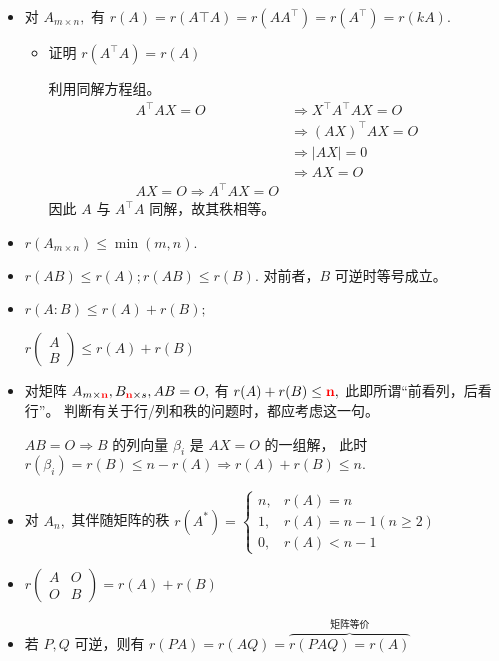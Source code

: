 \begin{itemize}
    \item 对 $ A_{m\times n}, $ 有 $ r(A) = r(A\top A) = r(AA^\top) = r(A^\top) = r(kA). $
    \begin{itemize}
        \item 证明 $ r(A^\top A) = r(A) $ 
        
        利用同解方程组。
        \begin{equation*}
            \begin{aligned}
                A^\top AX = O &\Rightarrow X^\top A^\top AX = O \\ 
                &\Rightarrow (AX)^\top AX = O \\ &\Rightarrow |AX| = 0
                \\ &\Rightarrow AX = O \\ 
                AX = O \Rightarrow A^\top AX = O
            \end{aligned}
        \end{equation*}
        因此 $ A $ 与 $ A^\top A $ 同解，故其秩相等。
    \end{itemize} 
    \item $ r(A_{m\times n})\leq \min(m,n). $ 
    \item $ r(AB) \leq r(A); r(AB) \leq r(B). $ 对前者，$ B $ 可逆时等号成立。
    \item $ r(A:B)\leq r(A) + r(B); $ 
    
    $ r(\begin{matrix}
        A \\ B 
    \end{matrix}) \leq r(A) + r(B)$ 
    \item 对矩阵 $ A_{m\times \textcolor{red}{\bf{n}}},B_{\textcolor{red}{\bf{n}}\times s}, AB=O, $
    有 $ r(A) + r(B) \leq \textcolor{red}{\bf{n}}, $ 此即所谓“前看列，后看行”。
    判断有关于行/列和秩的问题时，都应考虑这一句。

    $AB = O \Rightarrow B $ 的列向量 $ \beta_i $ 是 $ AX=O $ 的一组解，
    此时 $ r(\beta_i) = r(B) \leq n - r(A) \Rightarrow r(A) + r(B) \leq n. $ 
    \item 对 $ A_n, $ 其伴随矩阵的秩
    $ r(A^*)=\begin{cases}
        n,& r(A) = n\\ 1,&r(A) = n-1(n\geq 2)\\ 0,& r(A)< n-1
    \end{cases} $
    \item $ r\begin{pmatrix}
        A & O \\ O & B
    \end{pmatrix} = r(A) + r(B)$ 
    \item 若 $ P,Q $ 可逆，则有
    $ r(PA) = r(AQ) = \overbrace{r(PAQ) = r(A)}^{\textrm{矩阵等价}} $ 
    

\end{itemize}

